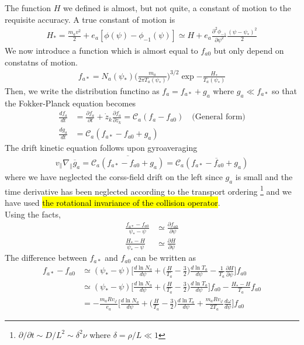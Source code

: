 The function $H$ we defined is almost, but not quite, a constant of motion to the requisite accuracy. A true constant of motion is
\begin{align}
    H_* = \frac{m_a v^2}{2}+e_a[\phi(\psi)-\phi_{-1}(\psi)] \simeq H + e_a \frac{\partial^2 \phi_{-1}}{\partial \psi^2}\frac{(\psi-\psi_*)^2}{2}
\end{align}
We now introduce a function which is almost equal to $f_{a0}$ but only depend on constatns of motion.
\begin{align}
    f_{a*} = N_a(\psi_*)\Big(\frac{m_a}{2\pi T_a(\psi_*)}\Big)^{3/2}\exp{-\frac{H_*}{T_a(\psi_*)}}
\end{align}
Then, we write the distribution functino as $f_a = f_{a*}+g_a$ where $g_a \ll f_{a*}$ so that the Fokker-Planck equation becomes
\begin{align}
    \frac{df_a}{dt} &= \frac{\partial f_a}{\partial t} + \dot{z}_k \frac{\partial f_a}{\partial z_k} = \mathcal{C}_a(f_a - f_{a0}) \quad \text{(General form)} \\
    \frac{d g_a}{dt} &= \mathcal{C}_a(f_{a*}-f_{a0}+g_a) 
\end{align}
The drift kinetic equation follows upon gyroaveraging
\begin{align}
    v_\parallel \nabla_\parallel \overbar{g}_a = \overbar{\mathcal{C}_a(f_{a*}-f_{a0}+g_a)} = \mathcal{C}_a(\overbar{f_{a*}-f_{a0}+g_a})
\label{DK}
\end{align}
where we have neglected the corss-field drift on the left since $g_a$ is small and the time derivative has been neglected according to the transport ordering \footnote{$\partial / \partial t \sim D/L^2 \sim \delta^2\nu$ where $\delta=\rho/L \ll 1$} and we have used \hl{the rotational invariance of the collision operator}. \\
Using the facts, 
\begin{align}
    \frac{f_{a*}-f_{a0}}{\psi_* - \psi} &\simeq \frac{\partial f_{a0}}{\partial \psi} \\
    \frac{H_*-H}{\psi_*-\psi} &\simeq \frac{\partial H}{\partial \psi}
\end{align}
The difference between $f_{a*}$ and $f_{a0}$ can be written as 
\begin{align}
    f_{a*}-f_{a0} &\simeq (\psi_* - \psi)\Bigg[\frac{d\ln{N_a}}{d\psi}+\Big(\frac{H}{T_a}-\frac{3}{2}\Big)\frac{d\ln{T_a}}{d\psi}-\frac{1}{T_a}\frac{\partial H}{\partial \psi}\Bigg]f_{a0} \\
    &\simeq (\psi_* - \psi)\Bigg[\frac{d\ln{N_a}}{d\psi}+\Big(\frac{H}{T_a}-\frac{3}{2}\Big)\frac{d\ln{T_a}}{d\psi}\Bigg]f_{a0}-\frac{H_*-H}{T_a}f_{a0} \\
    &=-\frac{m_a R v_\varphi}{e_a}\Bigg[\frac{d\ln{N_a}}{d\psi} + \Big(\frac{H}{T_a}-\frac{3}{2}\Big)\frac{d\ln{T_a}}{d\psi} + \frac{m_a R v_\varphi}{2T_a}\frac{d\omega}{d\psi}\Bigg] f_{a0}
\end{align}
